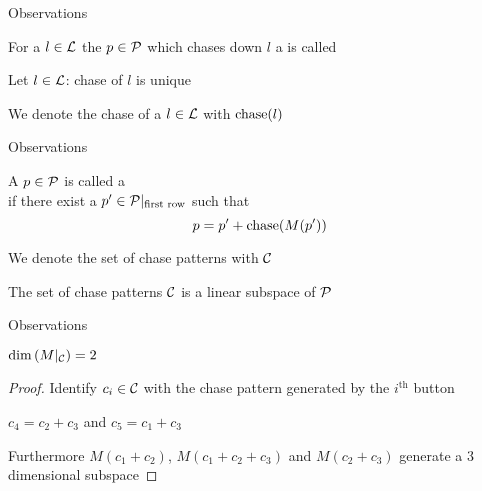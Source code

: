 \begin{frame}{Observations}
	\begin{definition}
		For a $l \in \mathcal{L}$ the $p \in \mathcal{P}$ which chases down $l$ a
		is called 
	\end{definition}
	
	\bigskip
	
	\begin{theorem}
		Let $l \in \mathcal{L}$: chase of $l$ is unique
	\end{theorem}
	
	\bigskip
	
	We denote the chase of a $l \in \mathcal{L}$ with $\operatorname{chase}(l)$
\end{frame}

\begin{frame}{Observations}
	\begin{definition}
		A $p \in \mathcal{P}$ is called a \structure{chase pattern}\\
		if there exist a $p' \in \mathcal{P}|_{\text{first row}}$ such that
		\[
			p = p' + \operatorname{chase}(M(p'))
		\]
	\end{definition}
	
	\bigskip
	
	We denote the set of chase patterns with $\mathcal{C}$
	
	\bigskip
	
	\begin{theorem}
		The set of chase patterns $\mathcal{C}$ is a linear subspace of $\mathcal{P}$
	\end{theorem}
\end{frame}

\begin{frame}{Observations}
	\begin{theorem}
		$\dim\left(M|_{\mathcal{C}}\right) = 2$
	\end{theorem}
	\begin{proof}
		Identify $c_{i} \in \mathcal{C}$ with the chase pattern generated by
		the $i^{\text{th}}$ button
		
		$c_{4} = c_{2} + c_{3}$ and $c_{5} = c_{1} + c_{3}$
		
		Furthermore $M(c_{1} + c_{2})$, $M(c_{1} + c_{2} + c_{3})$ and
		$M(c_{2} + c_{3})$ generate a 3 dimensional subspace
	\end{proof}
\end{frame}

